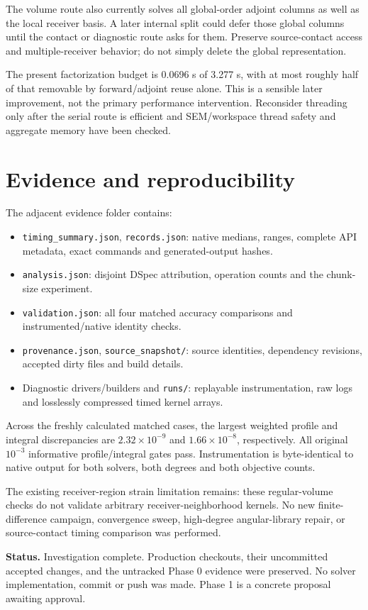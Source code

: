 \documentclass[11pt,a4paper]{article}
\begin{document}
The volume route also currently solves all global-order adjoint columns as well as the local receiver basis. A later internal split could defer those global columns until the contact or diagnostic route asks for them. Preserve source-contact access and multiple-receiver behavior; do not simply delete the global representation.

The present factorization budget is 0.0696 s of 3.277 s, with at most roughly half of that removable by forward/adjoint reuse alone. This is a sensible later improvement, not the primary performance intervention. Reconsider threading only after the serial route is efficient and SEM/workspace thread safety and aggregate memory have been checked.

\section{Evidence and reproducibility}
The adjacent evidence folder contains:
\begin{itemize}
\item \texttt{timing\_summary.json}, \texttt{records.json}: native medians, ranges, complete API metadata, exact commands and generated-output hashes.
\item \texttt{analysis.json}: disjoint DSpec attribution, operation counts and the chunk-size experiment.
\item \texttt{validation.json}: all four matched accuracy comparisons and instrumented/native identity checks.
\item \texttt{provenance.json}, \texttt{source\_snapshot/}: source identities, dependency revisions, accepted dirty files and build details.
\item Diagnostic drivers/builders and \texttt{runs/}: replayable instrumentation, raw logs and losslessly compressed timed kernel arrays.
\end{itemize}
Across the freshly calculated matched cases, the largest weighted profile and integral discrepancies are $2.32\times10^{-9}$ and $1.66\times10^{-8}$, respectively. All original $10^{-3}$ informative profile/integral gates pass. Instrumentation is byte-identical to native output for both solvers, both degrees and both objective counts.

The existing receiver-region strain limitation remains: these regular-volume checks do not validate arbitrary receiver-neighborhood kernels. No new finite-difference campaign, convergence sweep, high-degree angular-library repair, or source-contact timing comparison was performed.

\textbf{Status.} Investigation complete. Production checkouts, their uncommitted accepted changes, and the untracked Phase 0 evidence were preserved. No solver implementation, commit or push was made. Phase 1 is a concrete proposal awaiting approval.
\end{document}
